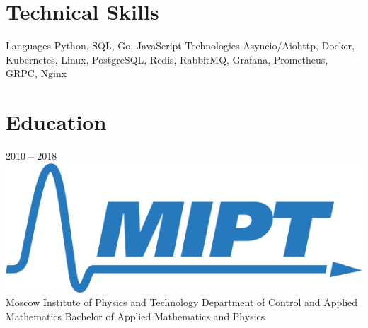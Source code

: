 \documentclass[11pt,a4paper]{moderncv}
\begin{document}
\section{Technical Skills}
  \cvline
    {Languages}{
      Python,
      SQL,
      Go,
      JavaScript
    }
  \cvline
    {Technologies}{
      Asyncio/Aiohttp,
      Docker,
      Kubernetes,
      Linux,
      PostgreSQL,
      Redis,
      RabbitMQ,
      Grafana,
      Prometheus,
      GRPC,
      Nginx
    }

\section{Education}
  \cventry
    {2010 – 2018}
    {\includegraphics[scale=0.5]{mipt-en-blue} Moscow Institute of Physics and Technology}
    {}
    {}{}
    {
      Department of Control and Applied Mathematics \newline{}
      Bachelor of Applied Mathematics and Physics \newline{}
    }
    {}
\end{document}
